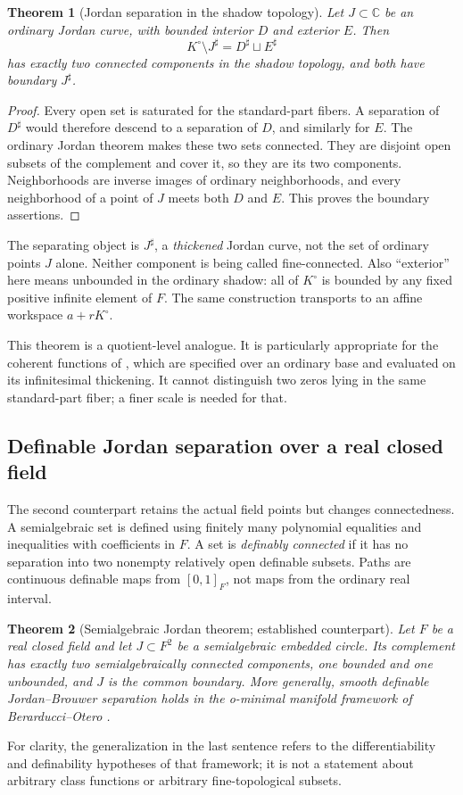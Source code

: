 \documentclass[11pt,letterpaper]{article}
\newtheorem{theorem}{Theorem}[section]
\theoremstyle{definition}
\theoremstyle{remark}
\newcommand{\C}{\mathbb C}
\newcommand{\sh}{^{\sharp}}
\numberwithin{equation}{section}
\begin{document}
\begin{theorem}[Jordan separation in the shadow topology]\label{thm:shadow}
Let $J\subset\C$ be an ordinary Jordan curve, with bounded interior $D$ and exterior $E$. Then
\[
K^\circ\setminus J\sh=D\sh\sqcup E\sh
\]
has exactly two connected components in the shadow topology, and both have boundary $J\sh$.
\end{theorem}
\begin{proof}
Every open set is saturated for the standard-part fibers. A separation of $D\sh$ would therefore descend to a separation of $D$, and similarly for $E$. The ordinary Jordan theorem makes these two sets connected. They are disjoint open subsets of the complement and cover it, so they are its two components. Neighborhoods are inverse images of ordinary neighborhoods, and every neighborhood of a point of $J$ meets both $D$ and $E$. This proves the boundary assertions.
\end{proof}
The separating object is $J\sh$, a \emph{thickened} Jordan curve, not the set of ordinary points $J$ alone. Neither component is being called fine-connected. Also ``exterior'' here means unbounded in the ordinary shadow: all of $K^\circ$ is bounded by any fixed positive infinite element of $F$. The same construction transports to an affine workspace $a+rK^\circ$.

This theorem is a quotient-level analogue. It is particularly appropriate for the coherent functions of \cite{SA}, which are specified over an ordinary base and evaluated on its infinitesimal thickening. It cannot distinguish two zeros lying in the same standard-part fiber; a finer scale is needed for that.

\subsection{Definable Jordan separation over a real closed field}
The second counterpart retains the actual field points but changes connectedness. A semialgebraic set is defined using finitely many polynomial equalities and inequalities with coefficients in $F$. A set is \emph{definably connected} if it has no separation into two nonempty relatively open definable subsets. Paths are continuous definable maps from $[0,1]_F$, not maps from the ordinary real interval.

\begin{theorem}[Semialgebraic Jordan theorem; established counterpart]\label{thm:defJordan}
Let $F$ be a real closed field and let $J\subset F^2$ be a semialgebraic embedded circle. Its complement has exactly two semialgebraically connected components, one bounded and one unbounded, and $J$ is the common boundary. More generally, smooth definable Jordan--Brouwer separation holds in the o-minimal manifold framework of Berarducci--Otero \cite{BO}.
\end{theorem}
For clarity, the generalization in the last sentence refers to the differentiability and definability hypotheses of that framework; it is not a statement about arbitrary class functions or arbitrary fine-topological subsets.
\end{document}

